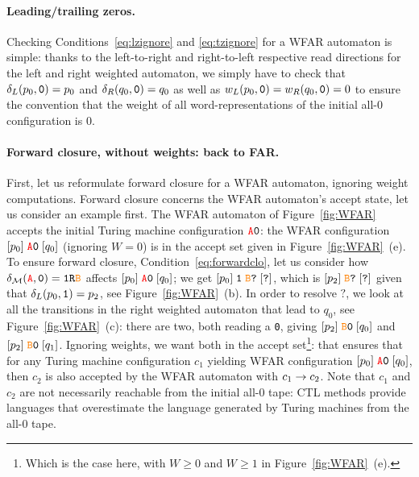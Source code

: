 \paragraph{Leading/trailing zeros.} Checking Conditions~\eqref{eq:lzignore} and \eqref{eq:tzignore} for a WFAR automaton is simple: thanks to the left-to-right and right-to-left respective read directions for the left and right weighted automaton, we simply have to check that $\delta_L(p_0,\texttt{0}) = p_0$ and $\delta_R(q_0,\texttt{0}) = q_0$ as well as $w_L(p_0,\texttt{0}) = w_R(q_0,\texttt{0}) = 0$ to ensure the convention that the weight of all word-representations of the initial all-0 configuration is 0.

\paragraph{Forward closure, without weights: back to FAR.} First, let us reformulate forward closure for a WFAR automaton, ignoring weight computations. Forward closure concerns the WFAR automaton's accept state, let us consider an example first. The WFAR automaton of Figure~\ref{fig:WFAR} accepts the initial Turing machine configuration $\texttt{\stateA}\szero$: the WFAR configuration $[p_0] \; \texttt{\stateA}\szero\; [q_0]$ (ignoring $W=0$) is in the accept set given in Figure~\ref{fig:WFAR}~(e). To ensure forward closure, Condition~\ref{eq:forwardclo}, let us consider how $\delta_\mathcal{M}(\texttt{\stateA},\szero) = \texttt{1R\stateB}$ affects $[p_0] \; \texttt{\stateA}\szero\; [q_0]$; we get $[p_0] \; \texttt{1}\; \texttt{\stateB}\texttt{?}\; [\texttt{?}]$, which is $[p_2] \; \texttt{\stateB}\texttt{?}\; [\texttt{?}]$ given that $\delta_L(p_0,\texttt{1}) = p_2$, see Figure~\ref{fig:WFAR}~(b). In order to resolve $\texttt{?}$, we look at all the transitions in the right weighted automaton that lead to $q_0$, see Figure~\ref{fig:WFAR}~(c): there are two, both reading a \texttt{0}, giving $[p_2] \; \texttt{\stateB}\texttt{0}\; [q_0]$ and $[p_2] \; \texttt{\stateB}\texttt{0}\; [q_1]$. Ignoring weights, we want both in the accept set\footnote{Which is the case here, with $W\geq 0$ and $W \geq 1$ in Figure~\ref{fig:WFAR}~(e).}: that ensures that for any Turing machine configuration $c_1$ yielding WFAR configuration $[p_0] \; \texttt{\stateA}\szero\; [q_0]$, then $c_2$ is also accepted by the WFAR automaton with $c_1 \to c_2$. Note that $c_1$ and $c_2$ are not necessarily reachable from the initial all-0 tape: CTL methods provide languages that overestimate the language generated by Turing machines from the all-0 tape.

